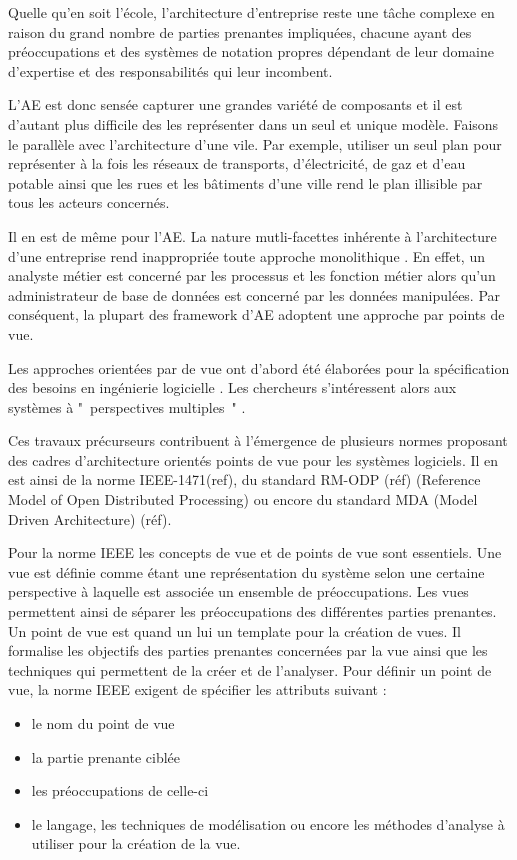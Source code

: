 Quelle qu'en soit l'école, l'architecture d'entreprise reste une tâche complexe 
\cite{steen2004supporting} en raison du grand nombre de parties prenantes 
impliquées, chacune ayant des préoccupations et des systèmes de notation propres 
dépendant de leur domaine d'expertise et des responsabilités qui leur incombent.

L'AE est donc sensée capturer une grandes variété de composants et il est 
d'autant plus difficile des les représenter dans un seul et unique modèle. 
Faisons le parallèle avec l'architecture d'une vile. Par exemple, utiliser un 
seul plan pour représenter à la fois les réseaux de transports, d'électricité, 
de gaz et d'eau potable ainsi que les rues et les bâtiments d'une ville rend le 
plan illisible par tous les acteurs concernés.

Il en est de même pour l'AE. La nature mutli-facettes inhérente à l'architecture 
d'une entreprise rend inappropriée toute approche monolithique 
\cite{armour1999bigpicture}. En effet, un analyste métier est concerné par les 
processus et les fonction métier alors qu'un administrateur de base de données 
est concerné par les données manipulées. Par conséquent, la plupart des 
framework d'AE adoptent une approche par points de vue.

Les approches orientées par de vue ont d'abord été élaborées pour la 
spécification des besoins en ingénierie logicielle \cite{mullery1979core}. Les 
chercheurs s'intéressent alors aux systèmes à "~perspectives multiples~" 
\cite{finkelstein1992viewpoints} \cite{kotonya1996requirements} 
\cite{nuseibeh1994multi} \cite{meyers1993representing}. 

Ces travaux précurseurs contribuent à l'émergence de plusieurs normes proposant 
des cadres d'architecture orientés points de vue pour les systèmes logiciels. Il 
en est ainsi de la norme IEEE-1471(ref), du standard RM-ODP (réf) (Reference 
Model of Open Distributed Processing) ou encore du standard MDA (Model Driven 
Architecture) (réf).

Pour la norme IEEE les concepts de vue et de points de vue sont 
essentiels. 
Une vue est définie comme étant une représentation du système selon une certaine 
perspective à laquelle est associée un ensemble de préoccupations. Les vues 
permettent ainsi de séparer les préoccupations des différentes parties 
prenantes. Un point de vue est quand un lui un template pour la création de 
vues. Il formalise les objectifs des parties prenantes concernées par la vue 
ainsi que les techniques qui permettent de la créer et de l'analyser. Pour 
définir un point de vue, la norme IEEE exigent de spécifier les attributs 
suivant :
\begin{itemize}
\item le nom du point de vue
\item la partie prenante ciblée
\item les préoccupations de celle-ci
\item le langage, les techniques de modélisation ou encore les méthodes 
d'analyse à utiliser pour la création de la vue. 
\end{itemize}


